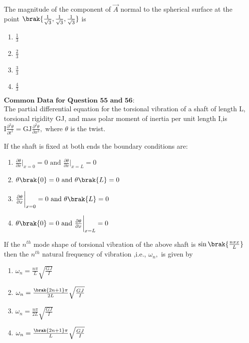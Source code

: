 \bigskip
\item The magnitude of the component of $\overrightarrow{A}$ normal to the spherical surface at the point $\brak{\frac{1}{\sqrt{3}},\frac{1}{\sqrt{3}},\frac{1}{\sqrt{3}}}$ is 
\begin{multicols}{4}
    \begin{enumerate}
        \item $\frac{1}{3}$
        \item $\frac{2}{3}$
        \item $\frac{3}{3}$
        \item $\frac{4}{3}$        
    \end{enumerate}
\end{multicols}
\bigskip
$\textbf{Common Data for Question 55 and 56:}$\\
The partial differential equation for the torsional vibration of a shaft of length L, torsional rigidity GJ, and mass polar moment of inertia per unit length I,is $\text{I}\frac{\partial^{2}\theta}{\partial t^{2}}=\text{GJ}\frac{\partial^{2}\theta}{\partial x^{2}},$ where $\theta$ is the twist. \bigskip
\item If the shaft is fixed at both ends the boundary conditions are:
\begin{multicols}{2}
    \begin{enumerate}
        \item $\frac{\partial \theta}{\partial x}\bigg|_{x=0}=0 \text{ and } \frac{\partial \theta}{\partial x} \bigg|_{x=L}=0$
		
        \item $\theta\brak{0}=0 \text{ and } \theta\brak{L}=0$
        \item $\frac{\partial \theta}{\partial x} \bigg|_{x=0}=0 \text{ and } \theta\brak{L}=0$
        \item $\theta\brak{0}=0 \text{ and } \frac{\partial \theta}{\partial x} \bigg|_{x=L}=0$        
    \end{enumerate}
\end{multicols}    
\bigskip
\item If the $n^{th}$ mode shape of torsional vibration of the above shaft is $\sin\brak{\frac{n\pi x}{L}}$ then the $n^{th}$ natural frequency of vibration ,i.e., $\omega_{n},$ is given by 
\begin{multicols}{2}
    \begin{enumerate}
        \item $\omega_{n}=\frac{n\pi}{L}\sqrt{\frac{GJ}{I}}$
        \item $\omega_{n}=\frac{\brak{2n+1}\pi}{2L}\sqrt{\frac{GJ}{I}}$
        \item $\omega_{n}=\frac{n\pi}{2L}\sqrt{\frac{GJ}{I}}$
        \item $\omega_{n}=\frac{\brak{2n+1}\pi}{L}\sqrt{\frac{GJ}{I}}$        
    \end{enumerate}
\end{multicols}    
